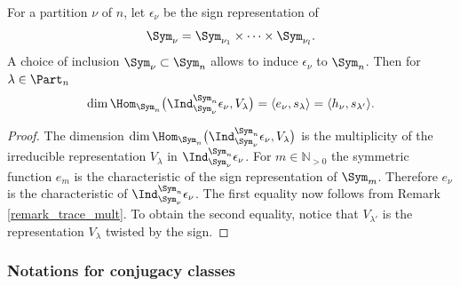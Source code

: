 \begin{lemma}\label{lemma_ind_sign}
For a partition $\nu$ of $n$, let $\epsilon_{\nu}$ be the sign representation of
\[
\Sym_{\nu}=\Sym_{\nu_1}\times\dots\times \Sym_{\nu_l}.
\]
A choice of inclusion $\Sym_{\nu}\subset \Sym_n$ allows to induce $\epsilon_{\nu}$ to $\Sym_n$. Then for $\lambda\in\Part_n$
\[
\dim \Hom_{\Sym_n} \bigl(\Ind_{\Sym_{\nu}}^{\Sym_n} \epsilon_{\nu}, V_{\lambda}\bigr)=\langle e_{\nu},s_{\lambda}\rangle =\langle h_{\nu},s_{\lambda'}\rangle.
\]
\end{lemma}
\begin{proof}
The dimension $\dim \Hom_{\Sym_n} \bigl(\Ind_{\Sym_{\nu}}^{\Sym_n} \epsilon_{\nu}, V_{\lambda}\bigr)$ is the multiplicity of the irreducible representation $V_{\lambda}$ in $\Ind_{\Sym_{\nu}}^{\Sym_n} \epsilon_{\nu}$. For $m\in \mathbb{N}_{>0}$ the symmetric function $e_{m}$ is the characteristic of the sign representation of $\Sym_m$. Therefore $e_{\nu}$ is the characteristic of $\Ind_{\Sym_{\nu}}^{\Sym_n} \epsilon_{\nu}$. The first equality now follows from Remark \ref{remark_trace_mult}.
To obtain the second equality, notice that $V_{\lambda'}$ is the representation $V_{\lambda}$ twisted by the sign.
\end{proof}

\label{sect_conjugacy_classes}
\subsubsection{Notations for conjugacy classes}\label{subsect_notations_adjoint_conj}

